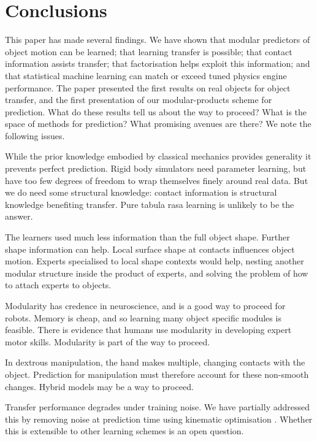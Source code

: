 
\section{Conclusions}\label{sec:Discussion}

This paper has made several findings. We have shown that modular predictors of object motion can be learned; that learning transfer is possible; that contact information assists transfer; that factorisation helps exploit this information; and that statistical machine learning can match or exceed tuned physics engine performance. The paper presented the first results on real objects for object transfer, and the first presentation of our modular-products scheme for prediction. What do these results tell us about the way to proceed? What is the space of methods for prediction? What promising avenues are there? We note the following issues.

 While the prior knowledge embodied by classical mechanics provides generality it prevents perfect prediction. Rigid body simulators need parameter learning, but have too few degrees of freedom to wrap themselves finely around real data. But we do need some structural knowledge: contact information is structural knowledge benefiting transfer. Pure tabula rasa learning is unlikely to be the answer. 

 The learners used much less information than the full object shape. Further shape information can help. Local surface shape at contacts influences object motion. Experts specialised to local shape contexts would help, nesting another modular structure inside the product of experts, and solving the problem of how to attach experts to objects.

 Modularity has credence in neuroscience, and is a good way to proceed for robots. Memory is cheap, and so learning many object specific modules is feasible. There is evidence that humans use modularity in developing expert motor skills. Modularity is part of the way to proceed.

  In dextrous manipulation, the hand makes multiple, changing contacts with the object. Prediction for manipulation must therefore account for these non-smooth changes. Hybrid models may be a way to proceed.

 Transfer performance degrades under training noise. We have partially addressed this by removing noise at prediction time using kinematic optimisation \cite{belter2014iros}. Whether this is extensible to other learning schemes is an open question.

